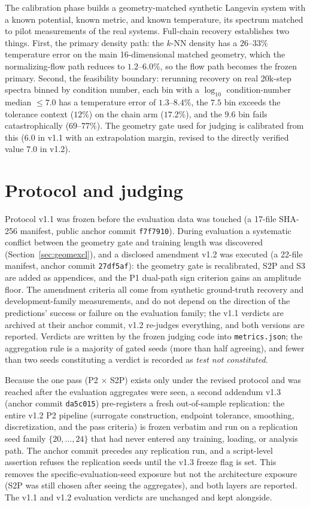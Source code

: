 \documentclass{article}
\begin{document}
The calibration phase builds a geometry-matched synthetic Langevin system with a
known potential, known metric, and known temperature, its spectrum matched to
pilot measurements of the real systems. Full-chain recovery establishes two
things. First, the primary density path: the $k$-NN density has a $26$--$33\%$
temperature error on the main 16-dimensional matched geometry, which the
normalizing-flow path reduces to $1.2$--$6.0\%$, so the flow path becomes the
frozen primary. Second, the feasibility boundary: rerunning recovery on real 20k-step
spectra binned by condition number, each bin with a $\log_{10}$ condition-number
median $\le 7.0$ has a temperature error of $1.3$--$8.4\%$, the $7.5$ bin exceeds
the tolerance context ($12\%$) on the chain arm ($17.2\%$), and the $9.6$ bin
fails catastrophically ($69$--$77\%$). The geometry gate used for judging is
calibrated from this ($6.0$ in v1.1 with an extrapolation margin, revised to the
directly verified value $7.0$ in v1.2).

\section{Protocol and judging}

Protocol v1.1 was frozen before the evaluation data was touched (a 17-file
SHA-256 manifest, public anchor commit \texttt{f7f7910}). During evaluation a
systematic conflict between the geometry gate and training length was discovered
(Section~\ref{sec:geomexcl}), and a disclosed amendment v1.2 was executed (a
22-file manifest, anchor commit \texttt{27df5af}): the geometry gate is
recalibrated, S2P and S3 are added as appendices, and the P1 dual-path sign
criterion gains an amplitude floor. The amendment criteria all come from
synthetic ground-truth recovery and development-family measurements, and do not
depend on the direction of the predictions' success or failure on the evaluation
family; the v1.1 verdicts are archived at their anchor commit, v1.2 re-judges
everything, and both versions are reported. Verdicts are written by the frozen
judging code into \texttt{metrics.json}; the aggregation rule is a majority of
gated seeds (more than half agreeing), and fewer than two seeds constituting a
verdict is recorded as \emph{test not constituted}.

Because the one pass (P2 $\times$ S2P) exists only under the revised protocol and
was reached after the evaluation aggregates were seen, a second addendum v1.3
(anchor commit \texttt{da5c015}) pre-registers a fresh out-of-sample replication:
the entire v1.2 P2 pipeline (surrogate construction, endpoint tolerance,
smoothing, discretization, and the pass criteria) is frozen verbatim and run on a
replication seed family $\{20,\dots,24\}$ that had never entered any training,
loading, or analysis path. The anchor commit precedes any replication run, and a
script-level assertion refuses the replication seeds until the v1.3 freeze flag is
set. This removes the specific-evaluation-seed exposure but not the architecture
exposure (S2P was still chosen after seeing the aggregates), and both layers are
reported. The v1.1 and v1.2 evaluation verdicts are unchanged and kept alongside.
\end{document}
